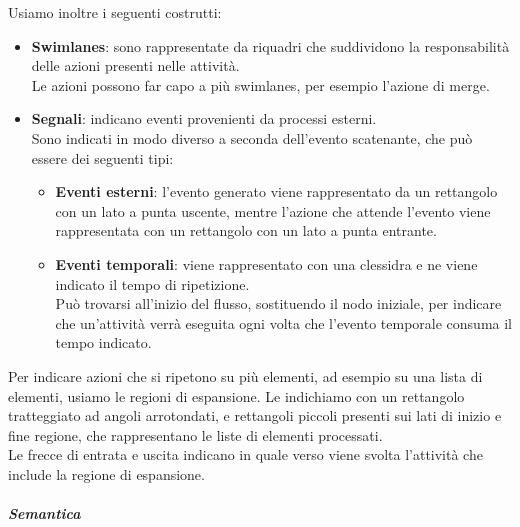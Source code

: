         Usiamo inoltre i seguenti costrutti:
        \begin{itemize}
            \item \textbf{Swimlanes}: sono rappresentate da riquadri che suddividono la responsabilità delle azioni presenti nelle attività.\\
                Le azioni possono far capo a più swimlanes, per esempio l'azione di merge.
            \item \textbf{Segnali}: indicano eventi provenienti da processi esterni.\\
            Sono indicati in modo diverso a seconda dell'evento scatenante, che può essere dei seguenti tipi:
            \begin{itemize}
                \item \textbf{Eventi esterni}: l'evento generato viene rappresentato da un rettangolo con un lato a punta uscente, mentre l'azione che attende l'evento viene rappresentata con un rettangolo con un lato a punta entrante.
                \item \textbf{Eventi temporali}: viene rappresentato con una clessidra e ne viene indicato il tempo di ripetizione.\\
                    Può trovarsi all'inizio del flusso, sostituendo il nodo iniziale, per indicare che un'attività verrà eseguita ogni volta che l'evento temporale consuma il tempo indicato.
            \end{itemize}
        \end{itemize}
        Per indicare azioni che si ripetono su più elementi, ad esempio su una lista di elementi, usiamo le regioni di espansione.
        Le indichiamo con un rettangolo tratteggiato ad angoli arrotondati, e rettangoli piccoli presenti sui lati di inizio e fine regione, che rappresentano le liste di elementi processati.\\
        Le frecce di entrata e uscita indicano in quale verso viene svolta l'attività che include la regione di espansione.

		\subparagraph{Semantica} %


